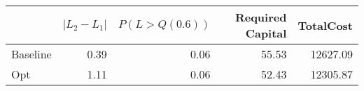 \begin{tabular}{lrrrr}
\toprule
{} &  $|L_2 - L_1|$ &  $P(L > Q(0.6))$ &  Required Capital &  TotalCost \\
\midrule
Baseline &           0.39 &             0.06 &             55.53 &   12627.09 \\
Opt      &           1.11 &             0.06 &             52.43 &   12305.87 \\
\bottomrule
\end{tabular}
